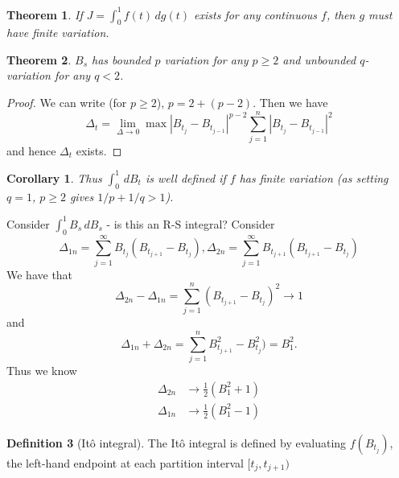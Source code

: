 \documentclass[10pt, oneside, reqno]{amsart}
\theoremstyle{plain}%
\newtheorem{thm}{Theorem}[section]
\newtheorem*{cor}{Corollary}
\theoremstyle{definition}
\newtheorem{defn}[thm]{Definition}
\theoremstyle{remark}
\begin{document}
\begin{thm}
    If $J = \int_0^1 f(t) \, dg(t)$ exists for any continuous $f$, then $g$ must have finite variation.  
\end{thm}

\begin{thm}
    $B_s$ has bounded $p$ variation for any $p \geq 2$ and unbounded $q$-variation for any $q < 2$.
\end{thm}

\begin{proof}
    We can write (for $p \geq 2$), $p = 2 + (p-2)$.  Then we have \[
        \Delta_t = \lim_{\Delta \rightarrow 0} \max |{B_{t_j}} - B_{t_{j-1}} |^{p-2} \sum_{j=1}^n |B_{t_j} - B_{t_{j-1}} |^{2}
    \] and hence $\Delta_t$ exists.
\end{proof}

\begin{cor}
    Thus $\int_0^1 \, dB_t$ is well defined if $f$ has finite variation (as setting $q = 1$, $ p \geq 2$ gives $1/p + 1/q > 1$).
\end{cor}

Consider $\int_0^1 B_s \, dB_s$ - is this an R-S integral?  Consider \[
    \Delta_{1n} = \sum_{j=1}^\infty B_{t_j} ( B_{t_{j+1}} - B_{t_j}), \Delta_{2n} = \sum_{j=1}^\infty B_{t_{j+1}} ( B_{t_{j+1}} - B_{t_j})
\]  We have that \[
    \Delta_{2n} - \Delta_{1n} = \sum_{j=1}^n ( B_{t_{j+1}} - B_{t_j})^2 \rightarrow 1
\] and \[
    \Delta_{1n} + \Delta_{2n} = \sum_{j=1}^n {B_{t_{j+1}}^2} - B_{t_j}^2 ) = B_1^2. 
\]  Thus we know \begin{align*}
    \Delta_{2n} &\rightarrow \frac{1}{2}(B_1^2 + 1) \\
    \Delta_{1n} &\rightarrow \frac{1}{2}(B_1^2 - 1) 
\end{align*}

\begin{defn}[It\^o integral]
    The It\^o integral is defined by evaluating $f(B_{t_j})$, the left-hand endpoint at each partition interval $[t_{j}, t_{j+1})$
\end{defn}
\end{document}

